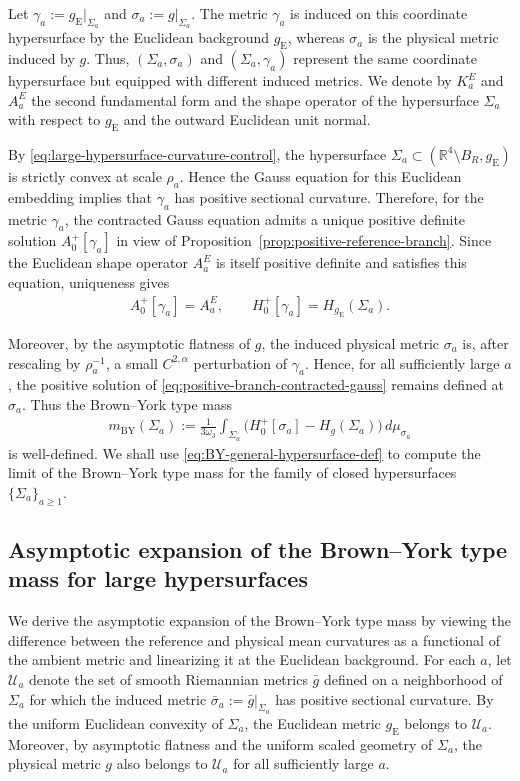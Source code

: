 \documentclass[10pt,a4paper]{amsart}
\newcommand{\R}{\mathbb{R}}
\newcommand{\gE}{g_{\mathrm{E}}}
\newcommand{\BY}{\mathrm{BY}}
\begin{document}
	Let $\gamma_a:=\gE|_{\Sigma_a}$ and $\sigma_a:=g|_{\Sigma_a}$. The metric $\gamma_a$ is induced
	on this coordinate hypersurface by the Euclidean background $\gE$, whereas
	$\sigma_a$ is the physical metric induced by $g$. Thus, $(\Sigma_a,\sigma_a)$ and $(\Sigma_a,\gamma_a)$ represent the same coordinate hypersurface but equipped with different induced metrics. We denote by
	$K_a^E$ and $A_a^E$ the second fundamental form and the shape operator of the hypersurface $\Sigma_a$ with respect to $\gE$ and the outward Euclidean unit normal. 
	
	By \eqref{eq:large-hypersurface-curvature-control}, the hypersurface
	$\Sigma_a\subset(\R^4\setminus B_R,\gE)$ is strictly convex at scale
	$\rho_a$. Hence the Gauss equation for this Euclidean embedding implies that
	$\gamma_a$ has positive sectional curvature. Therefore, for the metric
	$\gamma_a$, the contracted Gauss equation admits a unique positive definite
	solution $A_0^+[\gamma_a]$ in view of
	Proposition~\ref{prop:positive-reference-branch}. Since the Euclidean shape operator $A_a^E$ is itself positive definite and satisfies this equation, uniqueness gives \begin{align} A_0^+[\gamma_a]=A_a^E, \qquad H_0^+[\gamma_a]=H_{\gE}(\Sigma_a). \end{align}
	
	Moreover, by the asymptotic flatness of $g$, the induced physical metric
	$\sigma_a$ is, after rescaling by $\rho_a^{-1}$, a small
	$C^{2,\alpha}$ perturbation of $\gamma_a$. Hence, for all sufficiently large $a$, the positive solution of
	\eqref{eq:positive-branch-contracted-gauss} remains defined at $\sigma_a$.
	Thus the Brown--York type mass
	\begin{align}\label{eq:BY-general-hypersurface-def}
		m_{\BY}(\Sigma_a)
		:=
		\frac{1}{3\omega_3}
		\int_{\Sigma_a}
		\bigl(
		H_0^+[\sigma_a]-H_g(\Sigma_a)
		\bigr)\,d\mu_{\sigma_a}
	\end{align}
	is well-defined. We shall use \eqref{eq:BY-general-hypersurface-def} to compute
	the limit of the Brown--York type mass for the family of closed hypersurfaces
	$\{\Sigma_a\}_{a\geq 1}$.
	
	
	\subsection{Asymptotic expansion of the Brown--York type mass for large hypersurfaces}\label{subsec:large-surface-By-mass}
	
	We derive the asymptotic expansion of the Brown--York type mass by viewing
	the difference between the reference and physical mean curvatures as a
	functional of the ambient metric and linearizing it at the Euclidean
	background. For each $a$, let $\mathcal U_a$ denote the set of smooth
	Riemannian metrics $\bar g$ defined on a neighborhood of $\Sigma_a$ for
	which the induced metric $\bar\sigma_a:=\bar g|_{\Sigma_a}$ has positive sectional curvature. By the uniform Euclidean convexity of
	$\Sigma_a$, the Euclidean metric $\gE$ belongs to $\mathcal U_a$. Moreover,
	by asymptotic flatness and the uniform scaled geometry of $\Sigma_a$, the
	physical metric $g$ also belongs to $\mathcal U_a$ for all sufficiently
	large $a$.
	
\end{document}
